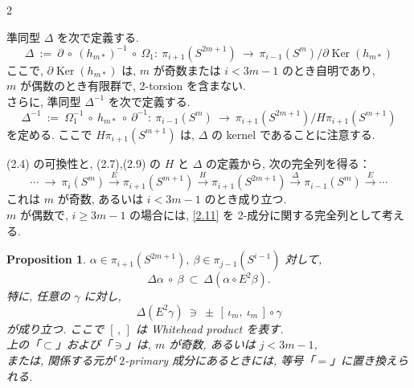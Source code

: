 \documentclass[10pt, leqno]{ltjsarticle} %
\newcommand{\Ker}{\operatorname{Ker}}
\numberwithin{equation}{section}
\theoremstyle{plain}
\newtheorem{proposition}[theorem]{Proposition}
\theoremstyle{definition}
\theoremstyle{remark}
\begin{document}
\begin{paracol}{2}

\noindent
準同型 \(\Delta\) を次で定義する. 
\begin{equation}\label{2.9}
\Delta\ :=\ \partial\ \circ\ (h_{m*})^{-1}\ \circ\ \Omega_1:\ 
\pi_{i+1}(S^{2m+1})\ \longrightarrow\ \pi_{i-1}(S^m)\big/\partial\Ker(h_{m*})
\tag{2.9}
\end{equation}
ここで, \(\partial\Ker(h_{m*})\) は, 
\(m\) が奇数または \(i<3m-1\) のとき自明であり, \\
\(m\) が偶数のとき有限群で, 2-torsion を含まない. \\
さらに, 準同型 \(\Delta^{-1}\) を次で定義する. 
\begin{equation}\label{2.10}
\Delta^{-1}\ :=\ \Omega_1^{-1}\ \circ\ h_{m*}\ \circ\ \partial^{-1}:\ 
\pi_{i-1}(S^m)\ \longrightarrow\ 
\pi_{i+1}(S^{2m+1})\big/ H\pi_{i+1}(S^{m+1})
\tag{2.10}
\end{equation}
を定める. ここで \(H\pi_{i+1}(S^{m+1})\) は, \(\Delta\) の kernel であることに注意する. 


\noindent
(2.4) の可換性と, (2.7),(2.9) の $H$ と $\Delta$ の定義から, 
次の完全列を得る：
\begin{equation}\label{2.11}
\cdots\ \longrightarrow\ 
\pi_i(S^m)\xrightarrow{\,E\,}\pi_{i+1}(S^{m+1})\xrightarrow{\,H\,}
\pi_{i+1}(S^{2m+1})\xrightarrow{\,\Delta\,}\pi_{i-1}(S^m)\xrightarrow{\,E\,}\cdots
\tag{2.11}
\end{equation}
これは $m$ が奇数, あるいは $i<3m-1$ のとき成り立つ. \\
$m$ が偶数で, $i\ge 3m-1$ の場合には, \eqref{2.11} を
2-成分に関する完全列として考える. 

\begin{proposition}\label{prop:2.5}
$\alpha\in\pi_{i+1}(S^{2m+1}), \ \beta\in \pi_{j-1}(S^{i-1})$ 対して, 
\[
\Delta\alpha\ \circ\ \beta\ \subset\ \Delta(\alpha\circ E^2\beta).
\]
特に, 任意の $\gamma$ に対し,
\[
\Delta(E^2\gamma)\ \ni\ \pm\,[\,\iota_m,\ \iota_m\,]\circ\gamma
\]
が成り立つ. ここで $[\, ,\,]$ は Whitehead product を表す. \\
上の「$\subset$」および「$\ni$」は, $m$ が奇数, 
あるいは $j<3m-1$, \\
または, 関係する元が \(2\)-primary 成分にあるときには, 
等号「$=$」に置き換えられる. 
\end{proposition}

\end{paracol}
\end{document}
